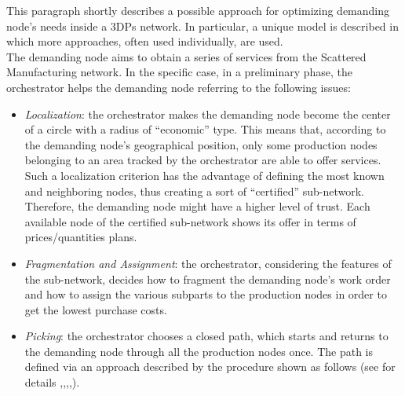 This paragraph shortly describes a possible approach for optimizing demanding node’s needs inside a 3DPs network. In particular, a unique model is described in which more approaches, often used individually, are used.\\
The demanding node aims to obtain a series of services from the Scattered Manufacturing network. In the specific case, in a preliminary phase, the orchestrator helps the demanding node referring to the following issues:
\begin{itemize}
    \item \textit{Localization}: the orchestrator makes the demanding node become the center of a circle with a radius of “economic” type. This means that, according to the demanding node’s geographical position, only some production nodes belonging to an area tracked by the orchestrator are able to offer services. Such a localization criterion has the advantage of defining the most known and neighboring nodes, thus creating a sort of “certified” sub-network. Therefore, the demanding node might have a higher level of trust. Each available node of the certified sub-network shows its offer in terms of prices/quantities plans.
    \item \textit{Fragmentation and Assignment}: the orchestrator, considering the features of the sub-network, decides how to fragment the demanding node’s work order and how to assign the various subparts to the production nodes in order to get the lowest purchase costs.
    \item \textit{Picking}: the orchestrator chooses a closed path, which starts and returns to the demanding node through all the production nodes once. The path is defined via an approach described by the procedure shown as follows (see for details \textcite{karp_patching_1979},\textcite{gutin_traveling_2002},\textcite{traveling_salesman_comp_study},\textcite{gutin2006traveling},\textcite{wang_towards_2016}).
\end{itemize}

